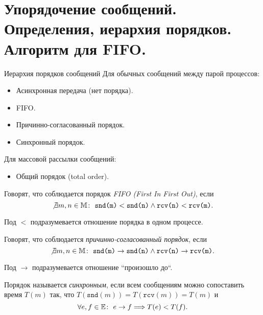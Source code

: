 \section{Упорядочение сообщений. Определения, иерархия порядков. Алгоритм для FIFO.}

\begin{definition} Иерархия порядков сообщений
    Для обычных сообщений между парой процессов:
    \begin{itemize}
        \item Асинхронная передача (нет порядка).
        \item FIFO.
        \item Причинно-согласованный порядок.
        \item Синхронный порядок.
    \end{itemize}

    Для массовой рассылки сообщений:
    \begin{itemize}
        \item Общий порядок (total order).
    \end{itemize}
\end{definition}

\begin{definition}
    Говорят, что соблюдается порядок \textit{FIFO (First In First Out)}, если
    \[
        \not \exists m,n \in \mathbb{M} \colon~ \texttt{snd(m)} < \texttt{snd(n)}
        \wedge \texttt{rcv(n)} < \texttt{rcv(m)}
    .\]
\end{definition}

\begin{remark}
    Под $<$ подразумевается отношение порядка в одном процессе.
\end{remark}

\begin{definition}
    Говорят, что соблюдается \textit{причинно-согласованный порядок}, если
    \[
        \not \exists m,n \in \mathbb{M} \colon~ \texttt{snd(m)} \rightarrow \texttt{snd(n)}
        \wedge \texttt{rcv(n)} \rightarrow \texttt{rcv(m)}
    .\]
\end{definition}

\begin{remark}
    Под $\to$ подразумевается отношение ``произошло до``.
\end{remark}

\begin{definition}
    Порядок называется \textit{синхронным}, если всем сообщениям можно сопоставить время $T(m)$ так, что $T(\texttt{snd}(m)) = T(\texttt{rcv}(m)) = T(m)$ и
    \[
        \forall e,f \in \mathbb{E} \colon~ e \rightarrow f
        \Longrightarrow T(e) < T(f)
    .\]
\end{definition}

